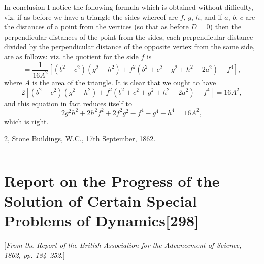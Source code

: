 \documentclass[11pt,a4paper]{article}
\newcommand{\paper}[2]{\section[#1]{#1\hfill\textnormal{[#2]}}}
\begin{document}
In conclusion I notice the following formula which is obtained without difficulty, viz. if as before we have a triangle the sides whereof are $f$, $g$, $h$, and if $a$, $b$, $c$ are the distances of a point from the vertices (so that as before $D = 0$) then the perpendicular distances of the point from the sides, each perpendicular distance divided by the perpendicular distance of the opposite vertex from the same side, are as follows: viz. the quotient for the side $f$ is
\[
= \frac{1}{16A^2}[(b^2-c^2)(g^2-h^2) + f^2(b^2+c^2+g^2+h^2-2a^2) - f^4],
\]
where $A$ is the area of the triangle. It is clear that we ought to have
\[
2[(b^2-c^2)(g^2-h^2) + f^2(b^2+c^2+g^2+h^2-2a^2) - f^4] = 16A^2,
\]
and this equation in fact reduces itself to
\[
2g^2h^2 + 2h^2f^2 + 2f^2g^2 - f^4 - g^4 - h^4 = 16A^2,
\]
which is right.

\begin{flushright}
2, Stone Buildings, W.C., 17th September, 1862.
\end{flushright}

\vspace{1.5em}
\hrule
\vspace{1.5em}

\paper{Report on the Progress of the Solution of Certain Special Problems of Dynamics}{298}

{\small
[\textit{From the Report of the British Association for the Advancement of Science, 1862, pp. 184--252.}]
\par}
\vspace{0.5em}

\setcounter{page}{513}
\end{document}
